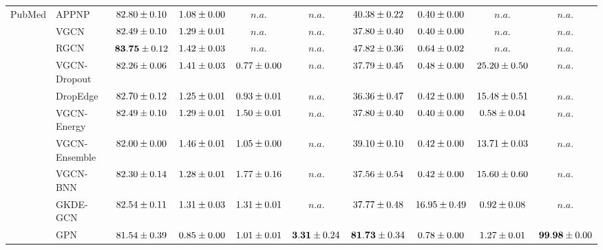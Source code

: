 \begin{table*}[!h]
{\begin{tabular}{ll|cccc|cccc}
    
        \midrule

        \multirow{10}{*}{PubMed}
        & APPNP & ${82.80\tiny \pm 0.10}$ & ${1.08\tiny \pm 0.00}$ & $n.a.$ & $n.a.$ & ${40.38\tiny \pm 0.22}$ & ${0.40\tiny \pm 0.00}$ & $n.a.$ & $n.a.$\\
        & VGCN & ${82.49\tiny \pm 0.10}$ & ${1.29\tiny \pm 0.01}$ & $n.a.$ & $n.a.$ & ${37.80\tiny \pm 0.40}$ & ${0.40\tiny \pm 0.00}$ & $n.a.$ & $n.a.$\\
        & RGCN & ${\mathbf{83.75}\tiny \pm 0.12}$ & ${1.42\tiny \pm 0.03}$ & $n.a.$ & $n.a.$ & ${47.82\tiny \pm 0.36}$ & ${0.64\tiny \pm 0.02}$ & $n.a.$ & $n.a.$\\
        & VGCN-Dropout & ${82.26\tiny \pm 0.06}$ & ${1.41\tiny \pm 0.03}$ & ${0.77\tiny \pm 0.00}$ & $n.a.$ & ${37.79\tiny \pm 0.45}$ & ${0.48\tiny \pm 0.00}$ & ${25.20\tiny \pm 0.50}$ & $n.a.$\\
        & DropEdge & ${82.70\tiny \pm 0.12}$ & ${1.25\tiny \pm 0.01}$ & ${0.93\tiny \pm 0.01}$ & $n.a.$ & ${36.36\tiny \pm 0.47}$ & ${0.42\tiny \pm 0.00}$ & ${15.48\tiny \pm 0.51}$ & $n.a.$\\
        & VGCN-Energy & ${82.49\tiny \pm 0.10}$ & ${1.29\tiny \pm 0.01}$ & ${1.50\tiny \pm 0.01}$ & $n.a.$ & ${37.80\tiny \pm 0.40}$ & ${0.40\tiny \pm 0.00}$ & ${0.58\tiny \pm 0.04}$ & $n.a.$\\
        & VGCN-Ensemble & ${82.00\tiny \pm 0.00}$ & ${1.46\tiny \pm 0.01}$ & ${1.05\tiny \pm 0.00}$ & $n.a.$ & ${39.10\tiny \pm 0.10}$ & ${0.42\tiny \pm 0.00}$ & ${13.71\tiny \pm 0.03}$ & $n.a.$\\
        & VGCN-BNN & ${82.30\tiny \pm 0.14}$ & ${1.28\tiny \pm 0.01}$ & ${1.77\tiny \pm 0.16}$ & $n.a.$ & ${37.56\tiny \pm 0.54}$ & ${0.42\tiny \pm 0.00}$ & ${15.60\tiny \pm 0.60}$ & $n.a.$\\
        & GKDE-GCN & ${82.54\tiny \pm 0.11}$ & ${1.31\tiny \pm 0.03}$ & ${1.31\tiny \pm 0.01}$ & $n.a.$ & ${37.77\tiny \pm 0.48}$ & ${{16.95}\tiny \pm 0.49}$ & ${0.92\tiny \pm 0.08}$ & $n.a.$\\
        & GPN & ${81.54\tiny \pm 0.39}$ & ${0.85\tiny \pm 0.00}$ & ${1.01\tiny \pm 0.01}$ & ${\mathbf{3.31}\tiny \pm 0.24}$ & ${\mathbf{81.73}\tiny \pm 0.34}$ & ${0.78\tiny \pm 0.00}$ & ${1.27\tiny \pm 0.01}$ & ${\mathbf{99.98}\tiny \pm 0.00}$\\


\end{tabular}}
\end{table*}
